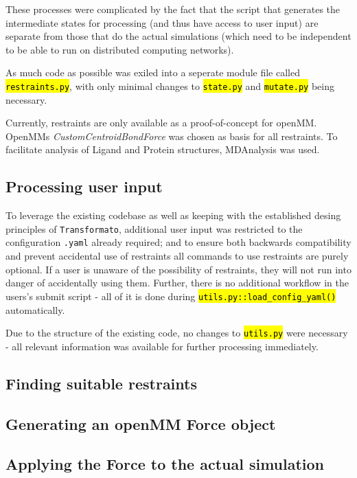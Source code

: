 \documentclass[oneside]{scrreprt}
\newcommand{\code}[1]{\texttt{\hl{#1}}}
\begin{document}
These processes were complicated by the fact that the script that generates the intermediate states for processing (and thus have access to user input) are separate from those that do the actual simulations (which need to be independent to be able to run on distributed computing networks).



 As much code as possible was exiled into a seperate module file called \code{restraints.py}, with only minimal changes to \code{state.py} and \code{mutate.py} being necessary. 

Currently, restraints are only available as a proof-of-concept for openMM. OpenMMs \emph{CustomCentroidBondForce} was chosen as basis for all restraints. To facilitate analysis of Ligand and Protein structures, MDAnalysis\supercite{agrawal2011,oliver_beckstein-proc-scipy-2016} was used.

\subsection{Processing user input}
To leverage the existing codebase as well as keeping with the established desing principles of \texttt{Transformato}, additional user input was restricted to the configuration \texttt{.yaml} already required; and to ensure both backwards compatibility and prevent accidental use of restraints all commands to use restraints are purely optional. If a user is unaware of the possibility of restraints, they will not run into danger of accidentally using them. Further, there is no additional workflow in the users's submit script - all of it is done during \code{utils.py::load\_config\_yaml()} automatically.

Due to the structure of the existing code, no changes to \code{utils.py} were necessary - all relevant information was available for further processing immediately.
\subsection{Finding suitable restraints}

\subsection{Generating an openMM Force object}

\subsection{Applying the Force to the actual simulation}
\end{document}
